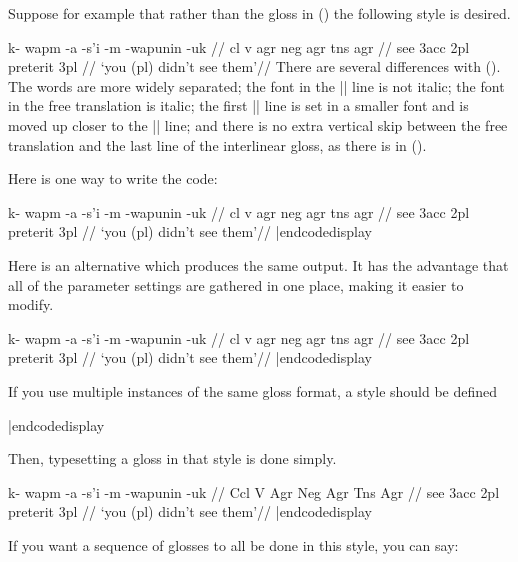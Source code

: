 Suppose for example that rather than the gloss in () the
following style is desired.

\framedisplay
\ex
\begingl[glspace=2em]
\gla[everygla=] k- wapm -a -s'i -m -wapunin -uk //
\glb[everyglb=\sc,aboveglbskip=-.4ex]
   cl v agr neg agr tns agr //
 see {\sc 3acc} {} {\sc 2pl} preterit {\sc 3pl} //
\glft[everyglft=\it,aboveglftskip=0pt] `you (pl) didn't see them'//
\endgl
\xe
\endframedisplay
There are several differences with ().  The words are
more widely separated; the font in the |\gla| line is not italic;  the
font in the free translation is italic; the first |\glb| line is set
in a smaller font and is moved up closer to the |\gla| line; and there
is no extra vertical skip between the free translation and the last
line of the interlinear gloss, as there is in ().

Here is one way to write the code:

\codedisplay
\ex
\begingl[glspace=2em]
\gla[everygla=] k- wapm -a -s'i -m -wapunin -uk //
\glb[everyglb=\sc,aboveglbskip=-.4ex]
   cl v agr neg agr tns agr //
 see {\sc 3acc} {} {\sc 2pl} preterit {\sc 3pl} //
\glft[everyglft=\it,aboveglftskip=0pt] `you (pl) didn't see them'//
\endgl
\xe
|endcodedisplay

Here is an alternative which produces the same output.  It has the
advantage that all of the parameter settings are gathered in one
place, making it easier to modify.

\codedisplay
\ex
\begingl[glspace=2em,everygla=,everyglb=\sc,
   aboveglbskip=-.4ex,everyglft=\it,aboveglftskip=0pt]
\gla k- wapm -a -s'i -m -wapunin -uk //
\glb cl v agr neg agr tns agr //
 see {\sc 3acc} {} {\sc 2pl} preterit {\sc 3pl} //
\glft `you (pl) didn't see them'//
\endgl
\xe
|endcodedisplay

If you use multiple instances of the same gloss format, a style should
be defined

\codedisplay
{}
|endcodedisplay

Then, typesetting a gloss in that style is done simply.

\codedisplay
\ex
\begingl[lingstyle=Potawatami]
\gla k- wapm -a -s'i -m -wapunin -uk //
\glb Ccl V Agr Neg Agr Tns Agr //
 see {\sc 3acc} {} {\sc 2pl} preterit {\sc 3pl} //
\glft `you (pl) didn't see them'//
\endgl
\xe
|endcodedisplay

If you want a sequence of glosses to all be done in this style, you can say:

